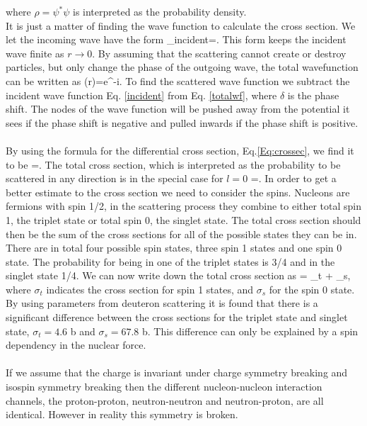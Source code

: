 where $\rho=\psi^*\psi$ is interpreted as the probability density.\\ 
It is just a matter of finding the wave function to calculate the cross section. We let the incoming wave have the form
\be
\psi_{incident}=.
\label{incident}
\ee
This form keeps the incident wave finite as $r \rightarrow 0.$ By assuming that the scattering cannot create or destroy particles, but only
change the phase of the outgoing wave, the total wavefunction can be written as
\be
\psi(r)=e^{-i\delta}.
\label{totalwf}
\ee
To find the scattered wave function we subtract the incident wave function Eq. \eqref{incident} from Eq. \eqref{totalwf},
where $\delta$ is the phase shift. 
The nodes of the wave function will be pushed away from the potential it sees if
the phase shift is negative and pulled inwards if the phase shift is 
positive.\\
\\
By using the formula for the differential cross section, Eq.\eqref{Eq:crossec}, we find it to be
\be
{}=.
\ee
The total cross section, which is interpreted as the probability to be scattered
in any direction is in the special case for $l=0$
\be
\sigma=.
\ee
In order to get a better estimate to the cross section we need to consider the
spins.
Nucleons are fermions with spin 1/2, in the scattering process they
combine to either total spin 1, the triplet state or total spin 0, the singlet state. The
total cross section should then be the sum of the cross sections for all of the
possible states they can be in. There are in total four possible spin states, three spin 1 states and one spin 0 state. The probability for being in one
of the triplet states is 3/4 and in the singlet state 1/4. We can now write down the total cross section as
\be
\sigma = \sigma_t + \sigma_s,
\ee 
where $\sigma_t$ indicates the cross section for spin 1 states, and $\sigma_s$ for the
spin 0 state. By using parameters from deuteron scattering it is found that 
there is a significant difference between the cross sections for the triplet
state and singlet state, $\sigma_t=4.6$ b and $\sigma_s=67.8$ b.  This
difference can only be explained by a spin dependency in the nuclear force.\\
\\
If we assume that the charge is invariant under charge symmetry breaking and isospin symmetry breaking then the different nucleon-nucleon interaction channels, the proton-proton, neutron-neutron and neutron-proton, are all  identical. However in reality this symmetry is broken.\\
